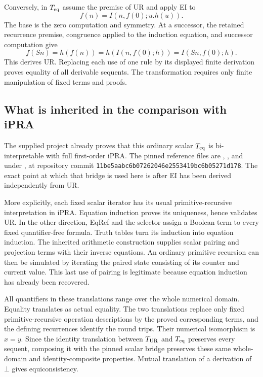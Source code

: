 Conversely, in $T_{\rm eq}$ assume the premise of UR and apply EI to
\[
                       f(n)=I(n,f(0);u.h(u)).
\]
The base is the zero computation and symmetry.  At a successor, the
retained recurrence premise, congruence applied to the induction
equation, and successor computation give
\[
 f(Sn)=h(f(n))=h(I(n,f(0);h))=I(Sn,f(0);h).
\]
This derives UR.  Replacing each use of one rule by its displayed finite
derivation proves equality of all derivable sequents.  The transformation
requires only finite manipulation of fixed terms and proofs.

\subsection{What is inherited in the comparison with iPRA}
The supplied project already proves that this ordinary scalar
$T_{\rm eq}$ is bi-interpretable with full first-order iPRA.  The pinned
reference files are ,
, and
 under
, at repository commit
\texttt{11be5aabc6b07262046e2553419bc6b05271d178}.
The exact point at which that bridge is used here is after EI has been
derived independently from UR.

More explicitly, each fixed scalar iterator has its usual
primitive-recursive interpretation in iPRA.  Equation induction proves
its uniqueness, hence validates UR.  In the other direction, EqRef
and the selector assign a Boolean term to every fixed quantifier-free
formula.  Truth tables turn its induction into equation induction.
The inherited arithmetic construction supplies scalar pairing and
projection terms with their inverse equations.  An ordinary primitive
recursion can then be simulated by iterating the paired state consisting
of its counter and current value.  This last use of pairing is legitimate
because equation induction has already been recovered.

All quantifiers in these translations range over the whole numerical
domain.  Equality translates as actual equality.  The two translations
replace only fixed primitive-recursive operation descriptions by the
proved corresponding terms, and the defining recurrences identify the
round trips.  Their numerical isomorphism is $x=y$.  Since the identity
translation between $T_{\rm UR}$ and $T_{\rm eq}$ preserves every sequent,
composing it with the pinned scalar bridge preserves these same whole-
domain and identity-composite properties.  Mutual translation of a
derivation of $\bot$ gives equiconsistency.

